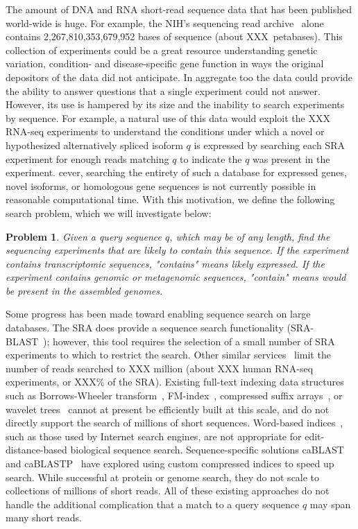 \documentclass[11pt]{article}
\newtheorem{problem}{Problem}
\begin{document}
The amount of DNA and RNA  short-read sequence data that has been published world-wide is huge. For example, the NIH's sequencing read archive~\cite{sra} alone contains 2,267,810,353,679,952 bases of sequence (about XXX~petabases). This collection of experiments could be a great resource understanding genetic variation, condition- and disease-specific gene function in ways the original depositors of the data did not anticipate. In aggregate too the data could provide the ability to answer questions  that a single experiment could not answer. However, its use is hampered by its size and the inability to search experiments by sequence. For example, a natural use of this data would exploit the XXX RNA-seq experiments to understand the conditions under which a novel or hypothesized alternatively spliced isoform $q$ is expressed by searching each SRA experiment for enough reads matching $q$ to indicate the $q$ was present in the experiment. cever, searching the entirety of such a database for expressed genes, novel isoforms, or homologous gene sequences  is not currently possible in reasonable computational time.  With this motivation, we define  the following search problem, which we will investigate below:
%
\begin{problem}\label{searchprob}
Given a query sequence $q$, which may be of any length, find the sequencing experiments that are likely to contain this sequence. If the experiment contains transcriptomic sequences, "contains" means likely expressed. If the experiment contains genomic or metagenomic sequences, "contain" means would be present in the assembled genomes.
\end{problem}


Some progress has been made toward enabling sequence search on large databases.  The SRA does provide a sequence search functionality (SRA-BLAST~\cite{srablast}); however, this tool requires the selection of a small number of SRA experiments to which to restrict the search. Other similar services~\cite{othersrablast} limit the number of reads searched to XXX million (about XXX human RNA-seq  experiments, or XXX\% of the SRA). Existing full-text indexing data structures~\cite{fulltextindex} such as Borrows-Wheeler transform~\cite{BWT}, FM-index~\cite{fmindex}, compressed suffix arrays~\cite{comps}, or wavelet trees~\cite{xxx} cannot at present be efficiently built at this scale, and do not directly support the search of millions of short sequences. Word-based indices~\cite{word1,word2}, such as those used by Internet search engines, are not appropriate for edit-distance-based biological sequence search. Sequence-specific solutions caBLAST~\cite{cablast} and caBLASTP~\cite{cablastp} have explored using custom compressed indices to speed up search. While successful at protein or genome search, they do not scale to collections of millions of short reads. All of these existing approaches do not handle the additional complication that a match to a query sequence $q$ may span many short reads.
\end{document}
